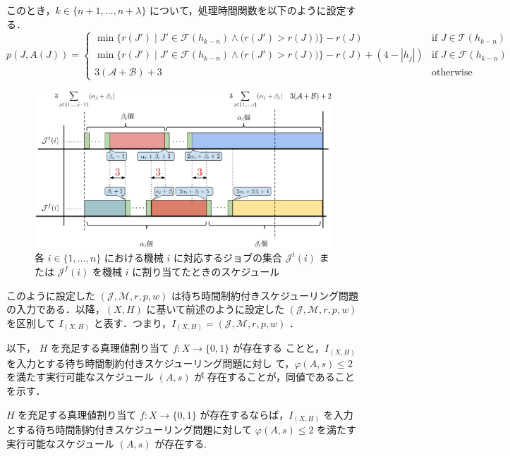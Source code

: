 \documentclass[12pt]{optlab-bachelor}
\begin{document}
このとき，$k \in \{n + 1, \ldots , n + \lambda\}$ について，処理時間関数を以下のように設定する．
{\small
\begin{equation}
  p(J,A(J)) = \left\{ \begin{array}{lll} \min \bigg\{r(J') \mid
  J' \in \mathcal{F}(h_{k - n}) \wedge \big(r(J') > r(J) \big) \bigg\} - r(J)
  & \text{if } J \in \mathcal{T}(h_{k - n}) \\ \min \bigg\{r(J') \mid
  J' \in \mathcal{F}(h_{k - n}) \wedge \big(r(J') > r(J) \big) \bigg\} - r(J)
  + (4 - |h_j|) & \text{if } J \in \mathcal{F}(h_{k - n}) \\ 3(\mathcal{A} + \mathcal{B}) + 3 & \text{otherwise}\end{array} \right. \tag{B.1}
\end{equation}
}

\begin{figure}[h]
  \centering
  \includegraphics[width = 16cm]{figure/3SAT1.pdf}
  \caption{各 $i \in \{1,\ldots,n\}$ における機械 $i$ に対応するジョブの集合 $\mathcal{J}^t(i)$ または $\mathcal{J}^f(i)$ を機械 $i$ に割り当てたときのスケジュール}
\end{figure}

このように設定した $(\mathcal{J}, \mathcal{M}, r, p, w)$ は待ち時間制約付きスケジューリング問題の入力である．以降，$(X,H)$ に基いて前述のように設定した $(\mathcal{J}, \mathcal{M}, r, p, w)$ を区別して $I_{(X,H)}$ と表す．つまり，$I_{(X,H)} = (\mathcal{J}, \mathcal{M}, r, p, w)$ ．

以下， $H$ を充足する真理値割り当て $f : X \to \{0,1\}$ が存在する
ことと，$I_{(X,H)}$ を入力とする待ち時間制約付きスケジューリング問題に対し
て，$\varphi(A,s) \le 2$ を満たす実行可能なスケジュール $(A,s)$ が
存在することが，同値であることを示す．

\begin{lemma}\label{l_6}
  $H$ を充足する真理値割り当て $f : X \to \{0,1\}$ が存在するならば，$I_{(X,H)}$ を入力とする待ち時間制約付きスケジューリング問題に対して $\varphi(A,s) \le 2$ を満たす実行可能なスケジュール $(A,s)$ が存在する.
\end{lemma}
\end{document}
